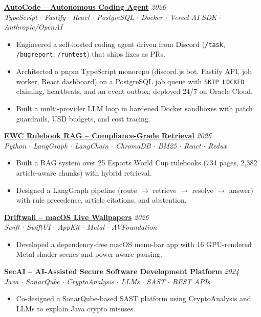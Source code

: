 \documentclass[a4paper,9pt]{extarticle}
\newcommand{\projentry}[3]{%
	\vspace{2pt}\noindent%
	{\bfseries\color{black} #1}\hfill{\itshape\color{gray} #2}\\[1pt]%
	{\itshape\color{gray}\small #3}\par\vspace{1pt}%
}
\begin{document}
	\projentry{\href{https://github.com/YashikKhunt/discord-coding-assistant}{\color{black}AutoCode -- Autonomous Coding Agent}}{2026}{TypeScript $\cdot$ Fastify $\cdot$ React $\cdot$ PostgreSQL $\cdot$ Docker $\cdot$ Vercel AI SDK $\cdot$ Anthropic/OpenAI}
	\begin{itemize}
		\item Engineered a self-hosted coding agent driven from Discord (\texttt{/task}, \texttt{/bugreport}, \texttt{/runtest}) that ships fixes as PRs.
		\item Architected a pnpm TypeScript monorepo (discord.js bot, Fastify API, job worker, React dashboard) on a PostgreSQL job queue with \texttt{SKIP LOCKED} claiming, heartbeats, and an event outbox; deployed 24/7 on Oracle Cloud.
		\item Built a multi-provider LLM loop in hardened Docker sandboxes with patch guardrails, USD budgets, and cost tracing.
	\end{itemize}
	
	\projentry{\href{https://github.com/YashikKhunt/ewc-rulebook-rag}{\color{black}EWC Rulebook RAG -- Compliance-Grade Retrieval}}{2026}{Python $\cdot$ LangGraph $\cdot$ LangChain $\cdot$ ChromaDB $\cdot$ BM25 $\cdot$ React $\cdot$ Redux}
	\begin{itemize}
		\item Built a RAG system over 25 Esports World Cup rulebooks (734 pages, 2{,}382 article-aware chunks) with hybrid retrieval.
		\item Designed a LangGraph pipeline (route $\rightarrow$ retrieve $\rightarrow$ resolve $\rightarrow$ answer) with rule precedence, article citations, and abstention.
	\end{itemize}
	
	\projentry{\href{https://github.com/YashikKhunt/Driftwall}{\color{black}Driftwall -- macOS Live Wallpapers}}{2026}{Swift $\cdot$ SwiftUI $\cdot$ AppKit $\cdot$ Metal $\cdot$ AVFoundation}
	\begin{itemize}
		\item Developed a dependency-free macOS menu-bar app with 16 GPU-rendered Metal shader scenes and power-aware pausing.
	\end{itemize}
	
	\projentry{SecAI -- AI-Assisted Secure Software Development Platform}{2024}{Java $\cdot$ SonarQube $\cdot$ CryptoAnalysis $\cdot$ LLMs $\cdot$ SAST $\cdot$ REST APIs}
	\begin{itemize}
		\item Co-designed a SonarQube-based SAST platform using CryptoAnalysis and LLMs to explain Java crypto misuses.
	\end{itemize}
	
\end{document}

